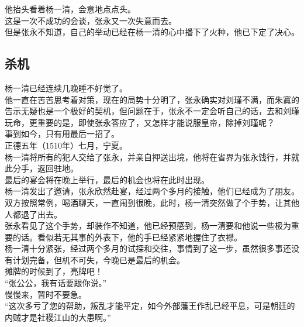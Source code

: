\begin{multicols}{\theparacolNo}
他抬头看着杨一清，会意地点点头。\\

这是一次不成功的会谈，张永又一次失意而去。\\

但是张永不知道，自己的举动已经在杨一清的心中播下了火种，他已下定了决心。\\

\subsection{杀机}
杨一清已经连续几晚睡不好觉了。\\

他一直在苦苦思考着对策，现在的局势十分明了，张永确实对刘瑾不满，而朱寘的告示无疑也是一个极好的契机，但问题在于，张永不一定会听自己的话，去和刘瑾玩命，更重要的是，即使张永答应了，又怎样才能说服皇帝，除掉刘瑾呢？\\

事到如今，只有用最后一招了。\\

正德五年（1510年）七月，宁夏。\\

杨一清将所有的犯人交给了张永，并亲自押送出境，他将在省界为张永饯行，并就此分手，返回驻地。\\

最后的宴会将在晚上举行，最后的机会也将在此时出现。\\

杨一清发出了邀请，张永欣然赴宴，经过两个多月的接触，他们已经成为了朋友。\\

双方按照常例，喝酒聊天，一直闹到很晚，此时，杨一清突然做了个手势，让其他人都退了出去。\\

张永看见了这个手势，却装作不知道，他已经预感到，杨一清要和他说一些极为重要的话。看似若无其事的外表下，他的手已经紧紧地握住了衣襟。\\

杨一清十分紧张，经过两个多月的试探和交往，事情到了这一步，虽然很多事还没有计划完备，但机不可失，今晚已是最后的机会。\\

摊牌的时候到了，亮牌吧！\\

“张公公，我有话要跟你说。”\\

慢慢来，暂时不要急。\\

“这次多亏了您的帮助，叛乱才能平定，如今外部藩王作乱已经平息，可是朝廷的内贼才是社稷江山的大患啊。”\\


\end{multicols}
